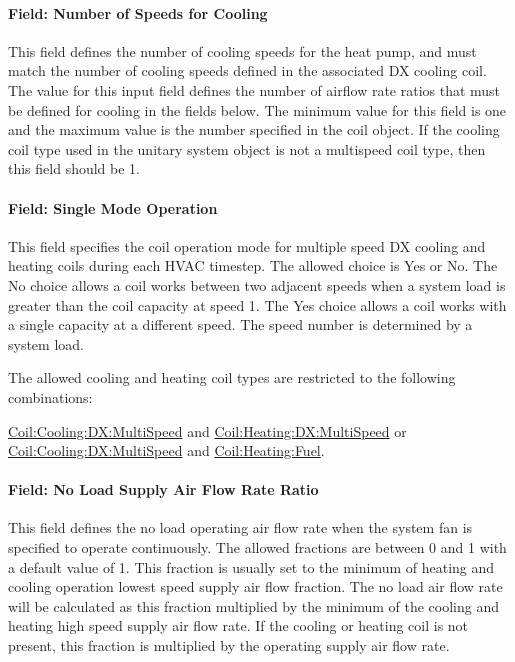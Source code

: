 \paragraph{Field: Number of Speeds for Cooling}\label{field-number-of-speeds-for-cooling-000}

This field defines the number of cooling speeds for the heat pump, and must match the number of cooling speeds defined in the associated DX cooling coil. The value for this input field defines the number of airflow rate ratios that must be defined for cooling in the fields below. The minimum value for this field is one and the maximum value is the number specified in the coil object. If the cooling coil type used in the unitary system object is not a multispeed coil type, then this field should be 1.

\paragraph{Field: Single Mode Operation}\label{field-single-mode-operation}

This field specifies the coil operation mode for multiple speed DX cooling and heating coils during each HVAC timestep. The allowed choice is Yes or No. The No choice allows a coil works between two adjacent speeds when a system load is greater than the coil capacity at speed 1. The Yes choice allows a coil works with a single capacity at a different speed. The speed number is determined by a system load.

The allowed cooling and heating coil types are restricted to the following combinations:

\hyperref[coilcoolingdxmultispeed]{Coil:Cooling:DX:MultiSpeed} and \hyperref[coilheatingdxmultispeed]{Coil:Heating:DX:MultiSpeed} or \hyperref[coilcoolingdxmultispeed]{Coil:Cooling:DX:MultiSpeed} and \hyperref[coilheatinggas-000]{Coil:Heating:Fuel}.

\paragraph{Field: No Load Supply Air Flow Rate Ratio}\label{field-no-load-supply-air-flow-rate-ratio}

This field defines the no load operating air flow rate when the system fan is specified to operate continuously. The allowed fractions are between 0 and 1 with a default value of 1. This fraction is usually set to the minimum of heating and cooling operation lowest speed supply air flow fraction. The no load air flow rate will be calculated as this fraction multiplied by the minimum of the cooling and heating high speed supply air flow rate. If the cooling or heating coil is not present, this fraction is multiplied by the operating supply air flow rate.

